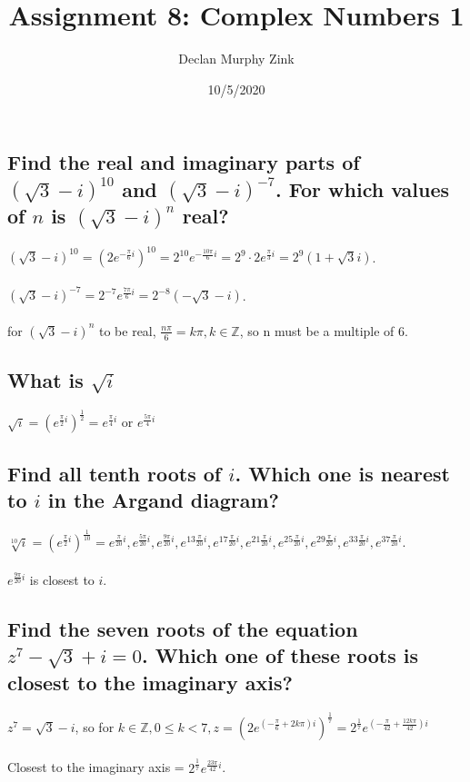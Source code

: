 \documentclass[12pt]{article}
\begin{document}
\title{Assignment 8: Complex Numbers 1}
\author{Declan Murphy Zink}
\date{10/5/2020}
\maketitle

\setcounter{section}{2}

\section{}
\subsection{
    Find the real and imaginary parts of $(\sqrt{3} - i)^{10}$ and $(\sqrt{3} - i)^{-7}$.
    For which values of $n$ is $(\sqrt{3} - i)^n$ real?
}
$(\sqrt{3} - i)^{10} = (2e^{- \frac{\pi}{6} i})^{10} = 2^{10} e^{- \frac{10 \pi}{6} i} = 2^9 \cdotp 2e^{\frac{\pi}{3} i} = 2^9(1 + \sqrt{3} i)$. \\ \\
$(\sqrt{3} - i)^{-7} = 2^{-7} e^{\frac{7 \pi}{6} i} = 2^{-8}(-\sqrt{3} -i)$. \\ \\
for $(\sqrt{3} - i)^{n}$ to be real, $\frac{n \pi}{6} = k \pi, k \in \mathds{Z}$, so n must be a multiple of 6.

\subsection{What is $\sqrt{i}$}
$\sqrt{i} = (e^{\frac{\pi}{2} i})^\frac{1}{2} = e^{\frac{\pi}{4} i}$ or $e^{\frac{5 \pi}{4} i}$

\subsection{
    Find all tenth roots of $i$. Which one is nearest to $i$ in the Argand diagram?
}
$\sqrt[10]{i} = (e^{\frac{\pi}{2} i})^\frac{1}{10} = e^{\frac{\pi}{20} i}, e^{\frac{5\pi}{20} i}, e^{\frac{9\pi}{20} i}, e^{13\frac{\pi}{20} i}, e^{17\frac{\pi}{20} i}, e^{21\frac{\pi}{20} i}, e^{25\frac{\pi}{20} i}, e^{29\frac{\pi}{20} i}, e^{33\frac{\pi}{20} i}, e^{37\frac{\pi}{20} i}.$ \\ \\
$e^{\frac{9\pi}{20} i}$ is closest to $i$.

\subsection{
    Find the seven roots of the equation $z^7 - \sqrt{3} + i = 0$. Which one of these roots is closest to the imaginary axis?
}
$z^7 = \sqrt{3} - i$,
so for $ k \in \mathds{Z}, 0 \leq k < 7, z = (2e^{(- \frac{\pi}{6} + 2k \pi) i})^{\frac{1}{7}} = 2^{\frac{1}{7}}e^{(- \frac{\pi}{42} + \frac{12k \pi}{42}) i}$ \\ \\
Closest to the imaginary axis = $2^{\frac{1}{7}}e^{\frac{23 \pi}{42} i}$.
\end{document}
